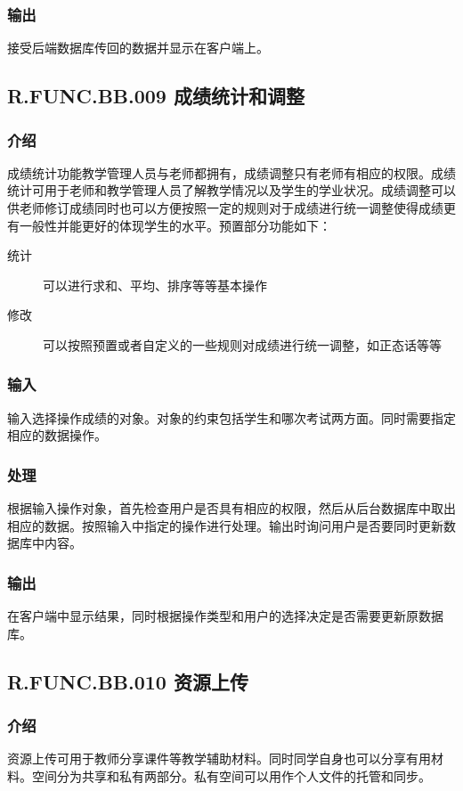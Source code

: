     \subsubsection{输出}
    接受后端数据库传回的数据并显示在客户端上。

  \subsection{R.FUNC.BB.009 成绩统计和调整}
    \subsubsection{介绍}
    成绩统计功能教学管理人员与老师都拥有，成绩调整只有老师有相应的权限。成绩统计可用于老师和教学管理人员了解教学情况以及学生的学业状况。成绩调整可以供老师修订成绩同时也可以方便按照一定的规则对于成绩进行统一调整使得成绩更有一般性并能更好的体现学生的水平。预置部分功能如下：
    \begin{description}
      \item[统计] 可以进行求和、平均、排序等等基本操作
      \item[修改] 可以按照预置或者自定义的一些规则对成绩进行统一调整，如正态话等等
    \end{description}
    \subsubsection{输入}
    输入选择操作成绩的对象。对象的约束包括学生和哪次考试两方面。同时需要指定相应的数据操作。
    \subsubsection{处理}
    根据输入操作对象，首先检查用户是否具有相应的权限，然后从后台数据库中取出相应的数据。按照输入中指定的操作进行处理。输出时询问用户是否要同时更新数据库中内容。
    \subsubsection{输出}
    在客户端中显示结果，同时根据操作类型和用户的选择决定是否需要更新原数据库。

  \subsection{R.FUNC.BB.010 资源上传}
    \subsubsection{介绍}
    资源上传可用于教师分享课件等教学辅助材料。同时同学自身也可以分享有用材料。空间分为共享和私有两部分。私有空间可以用作个人文件的托管和同步。
